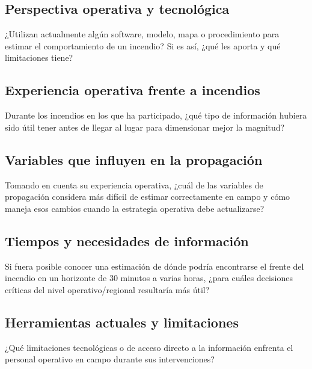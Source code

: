 \subsection{Perspectiva operativa y tecnológica}
\begin{enumerate}
  \pregunta ¿Utilizan actualmente algún software, modelo, mapa o procedimiento para estimar el comportamiento de un incendio? Si es así, ¿qué les aporta y qué limitaciones tiene?
\end{enumerate}


\subsection{Experiencia operativa frente a incendios}
\begin{enumerate}
  \pregunta Durante los incendios en los que ha participado, ¿qué tipo de información hubiera sido útil tener antes de llegar al lugar para dimensionar mejor la magnitud?
\end{enumerate}

\subsection{Variables que influyen en la propagación}
\begin{enumerate}
  \pregunta Tomando en cuenta su experiencia operativa, ¿cuál de las variables de propagación considera más difícil de estimar correctamente en campo y cómo maneja esos cambios cuando la estrategia operativa debe actualizarse?
\end{enumerate}

\subsection{Tiempos y necesidades de información}
\begin{enumerate}
  \pregunta Si fuera posible conocer una estimación de dónde podría encontrarse el frente del incendio en un horizonte de 30 minutos a varias horas, ¿para cuáles decisiones críticas del nivel operativo/regional resultaría más útil?
\end{enumerate}

\subsection{Herramientas actuales y limitaciones}
\begin{enumerate}
  \pregunta ¿Qué limitaciones tecnológicas o de acceso directo a la información enfrenta el personal operativo en campo durante sus intervenciones?
\end{enumerate}

